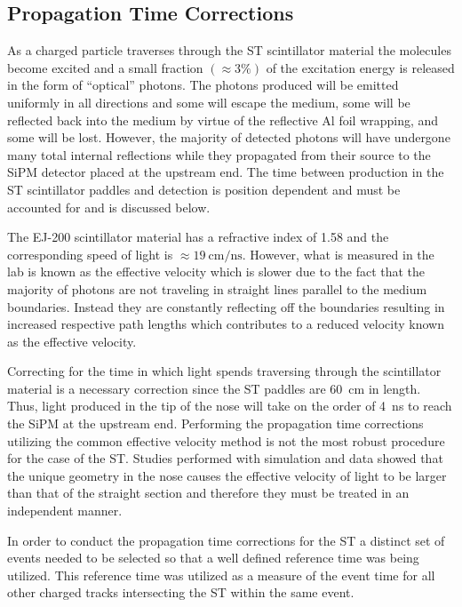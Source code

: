 \subsection{Propagation Time Corrections} \label{sec:calib_ptc}

As a charged particle traverses through the ST scintillator material the molecules become excited and a small fraction $(\approx 3\%)$ \cite{pdg_2012} of the excitation energy is released in the form of ``optical'' photons.  The photons produced will be emitted uniformly in all directions and some will escape the medium, some will be reflected back into the medium by virtue of the reflective Al foil wrapping, and some will be lost.  However, the majority of detected  photons will have undergone many total internal reflections while they propagated from their source to the SiPM detector placed at the upstream end.  The time between production in the ST scintillator paddles and detection is position dependent and must be accounted for and is discussed below.

The EJ-200 scintillator material has a refractive index of 1.58 \cite{ej200_specs} and the corresponding speed of light is $\approx \mathrm{19\ cm/ns}$.  However, what is measured in the lab is known as the effective velocity which is slower due to the fact that the majority of photons are not traveling in straight lines parallel to the medium boundaries.  Instead they are constantly reflecting off the boundaries resulting in increased respective path lengths which contributes to a reduced velocity known as the effective velocity.  

Correcting for the time in which light spends traversing through the scintillator material is a necessary correction since the ST paddles are 60~cm in length.  Thus, light produced in the tip of the nose will take on the order of 4~ns to reach the SiPM at the upstream end.  Performing the propagation time corrections utilizing the common effective velocity method is not the most robust procedure for the case of the ST.  Studies performed with simulation and data showed that the unique geometry in the nose causes the effective velocity of light to be larger than that of the straight section and therefore they must be treated in an independent manner.

In order to conduct the propagation time corrections for the ST a distinct set of events needed to be selected so that a well defined reference time was being utilized.  This reference time was utilized as a measure of the event time for all other charged tracks intersecting the ST within the same event.  

